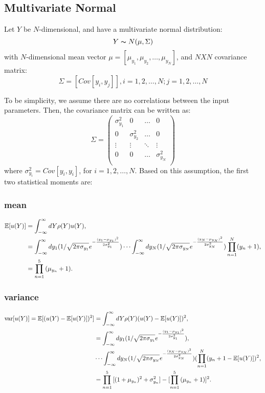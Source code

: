 \subsection{Multivariate Normal}
Let $Y$ be $N$-dimensional, and have a multivariate normal distribution:
\begin{equation}
Y \thicksim N(\mu,\Sigma)
\end{equation}
with $N$-dimensional mean vector $\mu=[\mu_{y_1},\mu_{y_2},\ldots,\mu_{y_N}]$, and $N X N$ covariance matrix:
\begin{equation}
\Sigma = [Cov[y_i,y_j]],i = 1,2,\ldots,N; j = 1,2,\ldots,N
\end{equation}

To be simplicity, we assume there are no correlations between the input parameters. Then, the covariance matrix can be written
as:
\begin{equation}
\Sigma = 
\begin{pmatrix} 
\sigma_{y_1}^2 & 0 &\ldots & 0 \\ 
0 & \sigma_{y_2}^2 &\ldots & 0 \\ 
\vdots &\vdots &\ddots & \vdots \\ 
0 & 0 & \ldots & \sigma_{y_N}^2\\ 
\end{pmatrix} 
\end{equation}
where $\sigma_{y_i}^2 = Cov[y_i,y_i]$, for $i = 1,2,\ldots,N$. Based on this assumption, the first two statistical moments are:

\subsubsection{mean}
\begin{align}
\mathbb{E}[ u(Y)] &=\int_{-\infty}^\infty dY \rho(Y)u(Y),\notag \\
  &=\int_{-\infty}^\infty dy_1 (1/\sqrt{2 \pi \sigma_{y_1}}e^{-\frac{(y_1-\mu_{y_1})^2}{2\sigma_{y_1}^2}})\cdots\int_{-\infty}^\infty dy_N (1/\sqrt{2 \pi \sigma_{y_N}}e^{-\frac{(y_N-\mu_{y_N})^2}{2\sigma_{y_N}^2}})\prod_{n=1}^N (y_n+1),\\
  &=\prod_{n=1}^5{(\mu_{y_n}+1)}.\notag 
\end{align}

\subsubsection{variance}
\begin{align}
\text{var}[u(Y)]=\mathbb{E}[ (u(Y)-\mathbb{E}[ u(Y)])^2] &= \int_{-\infty}^\infty dY \rho(Y)(u(Y)-\mathbb{E}[ u(Y)])^2,\notag \\
  &=\int_{-\infty}^\infty dy_1 (1/\sqrt{2 \pi \sigma_{y_1}}e^{-\frac{(y_1-\mu_{y_1})^2}{2\sigma_{y_1}^2}}), \notag \\
  &\cdots\int_{-\infty}^\infty dy_N  (1/\sqrt{2 \pi \sigma_{y_N}}e^{-\frac{(y_N-\mu_{y_N})^2}{2\sigma_{y_N}^2}})(\prod_{n=1}^N (y_n+1-\mathbb{E}[ u(Y)])^2,\\
  &=\prod_{n=1}^5{[(1+\mu_{y_n})^2+\sigma_{y_n}^2]} - [\prod_{n=1}^5{(\mu_{y_n}+1)}]^2. \notag
\end{align}

